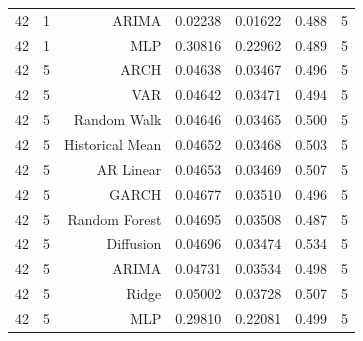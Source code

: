 \begin{table}[!htbp]
\begin{tabular}{lrrrrrr}
42 & 1 & ARIMA & 0.02238 & 0.01622 & 0.488 & 5 \\
42 & 1 & MLP & 0.30816 & 0.22962 & 0.489 & 5 \\
42 & 5 & ARCH & 0.04638 & 0.03467 & 0.496 & 5 \\
42 & 5 & VAR & 0.04642 & 0.03471 & 0.494 & 5 \\
42 & 5 & Random Walk & 0.04646 & 0.03465 & 0.500 & 5 \\
42 & 5 & Historical Mean & 0.04652 & 0.03468 & 0.503 & 5 \\
42 & 5 & AR Linear & 0.04653 & 0.03469 & 0.507 & 5 \\
42 & 5 & GARCH & 0.04677 & 0.03510 & 0.496 & 5 \\
42 & 5 & Random Forest & 0.04695 & 0.03508 & 0.487 & 5 \\
42 & 5 & Diffusion & 0.04696 & 0.03474 & 0.534 & 5 \\
42 & 5 & ARIMA & 0.04731 & 0.03534 & 0.498 & 5 \\
42 & 5 & Ridge & 0.05002 & 0.03728 & 0.507 & 5 \\
42 & 5 & MLP & 0.29810 & 0.22081 & 0.499 & 5 \\
\bottomrule
\end{tabular}
\end{table}
